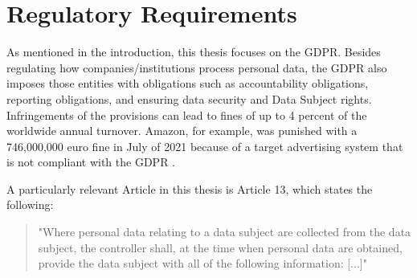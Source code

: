 


\graphicspath{{3/figures/}}

\section{Regulatory Requirements}
As mentioned in the introduction, this thesis focuses on the GDPR. Besides regulating how companies/institutions process personal data, the GDPR also imposes those entities with obligations such as accountability obligations, reporting obligations, and ensuring data security and Data Subject rights. Infringements of the provisions can lead to fines of up to 4 percent of the worldwide annual turnover. Amazon, for example, was punished with a 746,000,000 euro fine in July of 2021 because of a target advertising system that is not compliant with the GDPR \cite{bodoni_amazon_nodate}\cite{european_commission_antitrust_nodate}. 

A particularly relevant Article in this thesis is Article 13, which states the following:

\begin{quote}
"Where personal data relating to a data subject are collected from the data
subject, the controller shall, at the time when personal data are obtained,
provide the data subject with all of the following information: [...]"
\end{quote}

